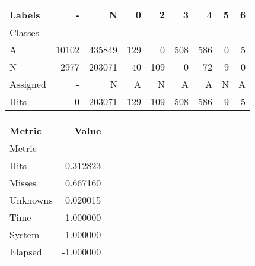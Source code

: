 \begin{tabular}{l|r|r|r|r|r|r|r|r}

Labels &      - &       N &    0 &    2 &    3 &    4 &  5 &  6 \\\hline
Classes  &        &         &      &      &      &      &    &    \\\hline
\hline
A        &  10102 &  435849 &  129 &    0 &  508 &  586 &  0 &  5 \\\hline
N        &   2977 &  203071 &   40 &  109 &    0 &   72 &  9 &  0 \\\hline
\hline
Assigned &      - &       N &    A &    N &    A &    A &  N &  A \\\hline
Hits     &      0 &  203071 &  129 &  109 &  508 &  586 &  9 &  5 
\end{tabular}
\begin{tabular}{l|r}

Metric   &     Value \\\hline
Metric   &           \\\hline
\hline
Hits     &  0.312823 \\\hline
Misses   &  0.667160 \\\hline
Unknowns &  0.020015 \\\hline
Time     & -1.000000 \\\hline
System   & -1.000000 \\\hline
Elapsed  & -1.000000 
\end{tabular}

